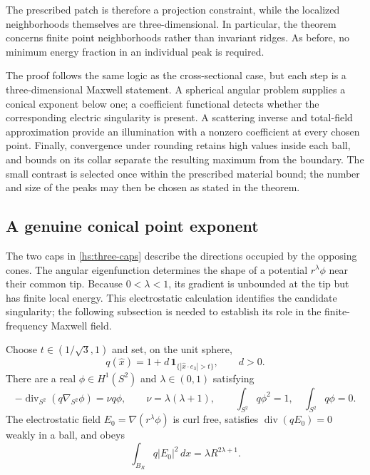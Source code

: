 The prescribed patch is therefore a projection constraint, while the
localized neighborhoods themselves are three-dimensional.  In particular,
the theorem concerns finite point neighborhoods rather than invariant ridges.
As before, no minimum energy fraction in an individual peak is required.

The proof follows the same logic as the cross-sectional case, but each
step is a three-dimensional Maxwell statement.  A spherical angular
problem supplies a conical exponent below one; a coefficient functional
detects whether the corresponding electric singularity is present.  A
scattering inverse and total-field approximation provide an illumination
with a nonzero coefficient at every chosen point.  Finally, convergence
under rounding retains high values inside each ball, and bounds on its
collar separate the resulting maximum from the boundary.  The small
contrast is selected once within the prescribed material bound; the
number and size of the peaks may then be chosen as stated in the theorem.

\subsection{A genuine conical point exponent}
\label{hs:three-angular-subsection}

The two caps in \eqref{hs:three-caps} describe the directions occupied
by the opposing cones.  The angular eigenfunction determines the shape of
a potential $r^\lambda\phi$ near their common tip.  Because
$0<\lambda<1$, its gradient is unbounded at the tip but has finite local
energy.  This electrostatic calculation identifies the candidate
singularity; the following subsection is needed to establish its role in
the finite-frequency Maxwell field.

\begin{lemma}
\label{hs:three-angular}
Choose $t\in(1/\sqrt3,1)$ and set, on the unit sphere,
\begin{equation}
 q(\widehat x)=1+d\,\mathbf1_{\{|\widehat x\cdot e_3|>t\}},
 \qquad d>0.
 \label{hs:three-caps}
\end{equation}
There are a real $\phi\in H^1(S^2)$ and $\lambda\in(0,1)$ satisfying
\begin{equation}
 -\operatorname{div}_{S^2}(q\nabla_{S^2}\phi)
   =\nu q\phi,\qquad
 \nu=\lambda(\lambda+1),\qquad
 \int_{S^2}q\phi^2=1,\quad \int_{S^2}q\phi=0.
 \label{hs:three-angular-eigenproblem}
\end{equation}
The electrostatic field $E_0=\nabla(r^\lambda\phi)$ is curl free,
satisfies $\operatorname{div}(qE_0)=0$ weakly in a ball, and obeys
\begin{equation}
 \int_{B_R}q|E_0|^2\,dx=\lambda R^{2\lambda+1}.
 \label{hs:three-static-energy}
\end{equation}
\end{lemma}

